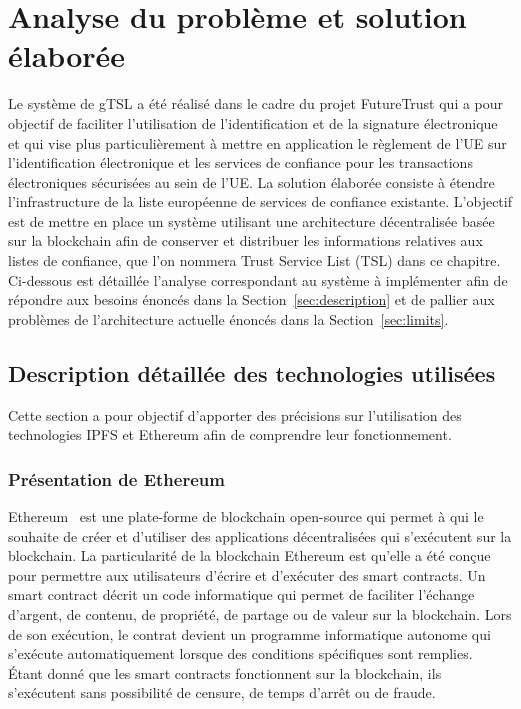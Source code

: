 \documentclass{tnreport}
\begin{document}
\chapter{Analyse du problème et solution élaborée}
\label{sec:analyse}

Le système de gTSL a été réalisé dans le cadre du projet FutureTrust qui a pour objectif de faciliter l'utilisation de l'identification et de la signature électronique et qui vise plus particulièrement à mettre en application le règlement de l'UE sur l'identification électronique et les services de confiance pour les transactions électroniques sécurisées au sein de l'UE.
La solution élaborée consiste à étendre l'infrastructure de la liste européenne de services de confiance existante. L'objectif est de mettre en place un système utilisant une architecture décentralisée basée sur la blockchain afin de conserver et distribuer les informations relatives aux listes de confiance, que l'on nommera Trust Service List (TSL) dans ce chapitre. Ci-dessous est détaillée l'analyse correspondant au système à implémenter afin de répondre aux besoins énoncés dans la Section~\ref{sec:description} et de pallier aux problèmes de l'architecture actuelle énoncés dans la Section~\ref{sec:limits}.

\section{Description détaillée des technologies utilisées}

Cette section a pour objectif d'apporter des précisions sur l'utilisation des technologies IPFS et Ethereum afin de comprendre leur fonctionnement.

\subsection{Présentation de Ethereum}

Ethereum~\cite{eth} est une plate-forme de blockchain open-source qui permet à qui le souhaite de créer et d'utiliser des applications décentralisées qui s'exécutent sur la blockchain. 
La particularité de la blockchain Ethereum est qu'elle a été conçue pour permettre aux utilisateurs d'écrire et d'exécuter des smart contracts. Un smart contract décrit un code informatique qui permet de faciliter l'échange d'argent, de contenu, de propriété, de partage ou de valeur sur la blockchain.
Lors de son exécution, le contrat devient un programme informatique autonome qui s'exécute automatiquement lorsque des conditions spécifiques sont remplies. Étant donné que les smart contracts fonctionnent sur la blockchain, ils s'exécutent sans possibilité de censure, de temps d'arrêt ou de fraude. 
\end{document}
